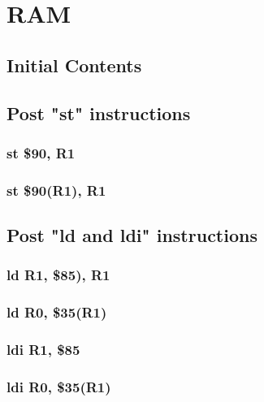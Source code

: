 \documentclass{article}
\begin{document}
\section{RAM}
    \subsection{Initial Contents} \label{ram_init}
    \subsection{Post "st" instructions}
        \subsubsection{st \$90, R1} \label{ram_st_case_1}
            
        \subsubsection{st \$90(R1), R1} \label{ram_st_case_2}
            
    \subsection{Post "ld and ldi" instructions}
        \subsubsection{ld R1, \$85), R1} \label{ram_ld_case_1}
            
        \subsubsection{ld R0, \$35(R1)} \label{ram_ld_case_2}
            
        \subsubsection{ldi R1, \$85} \label{ram_ldi_case_3}
            
        \subsubsection{ldi R0, \$35(R1)} \label{ram_ldi_case_4}
            
    
\end{document}

